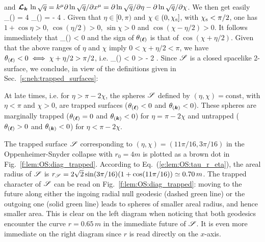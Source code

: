  and
 $\bm{\mathcal{L}}_{\bm{\bm{k}}}\, \ln \sqrt{q} = k^\mu \partial \ln\sqrt{q} /\partial x^\mu =
 \partial \ln\sqrt{q} /\partial \eta - \partial\ln  \sqrt{q} /\partial \chi$.
We then get easily
\be
    \theta_{(\wl)} = 4 
    \qand
    \theta_{()} = - 4  .
\ee
Given that $\eta\in [0,\pi)$ %
and $\chi\in(0,\chi_{\rm s}]$, with $\chi_{\rm s} < \pi/2$,
one has $1 + \cos\eta > 0$, $\cos(\eta/2) > 0$, $\sin\chi > 0$
and $\cos(\chi - \eta/2) > 0$. It follows immediately that
\be
    \theta_{()} < 0
\ee
and the sign of $\theta_{(\bm{\ell})}$ is that of $\cos(\chi + \eta/2)$.
Given that the above ranges of $\eta$ and $\chi$ imply $0 < \chi + \eta/2 < \pi$,
we have $\theta_{(\bm{\ell})} < 0 \iff \chi + \eta/2 > \pi/2$, i.e.
\be \label{e:lem:theta_l_neg}
    \theta_{(\wl)} < 0 \iff \eta > \pi - 2 \chi .
\ee
Since $\mathscr{S}$ is a closed spacelike 2-surface,
we conclude, in view of the definitions given in Sec.~\ref{s:neh:trapped_surfaces}:

\begin{prop}
\label{p:lem:trapped_surfaces}
At late times, i.e. for $\eta > \pi - 2 \chi$, the spheres $\mathscr{S}$ defined
by $(\eta,\chi) = \mathrm{const}$, with $\eta<\pi$ and $\chi>0$,
are trapped surfaces ($\theta_{(\bm{\ell})} < 0$ and $\theta_{(\bm{k})} < 0$).
These spheres are marginally trapped
($\theta_{(\bm{\ell})} = 0$ and $\theta_{(\bm{k})} < 0$)
for $\eta = \pi - 2 \chi$
and untrapped ($\theta_{(\bm{\ell})} > 0$ and $\theta_{(\bm{k})} < 0$) for $\eta <  \pi - 2 \chi$.
\end{prop}

\begin{example}
The trapped surface $\mathscr{S}$ corresponding to $(\eta,\chi) = (11\pi/16, 3\pi/16)$
in the Oppen\-heimer-Snyder collapse with $r_0 = 4 m$
is plotted as a brown dot in Fig.~\ref{f:lem:OS:diag_trapped}. According
to Eq.~(\ref{e:lem:OS:tau_r_eta}), the areal radius of $\mathscr{S}$ is
$r_{\mathscr{S}} = 2\sqrt{2} \sin(3\pi/16) (1 + \cos(11\pi/16)) \simeq 0.70\, m$.
The trapped character of $\mathscr{S}$ can be read on Fig.~\ref{f:lem:OS:diag_trapped}:
moving to the future along either the ingoing radial null geodesic (dashed green line)
or the outgoing one (solid green line) leads to spheres of smaller areal radius,
and hence smaller area. This is clear on the left diagram when noticing
that both geodesics encounter the curve $r=0.65\, m$ in the immediate future of $\mathscr{S}$.
It is even more immediate on the right diagram since $r$ is read directly on the $x$-axis.
\end{example}

